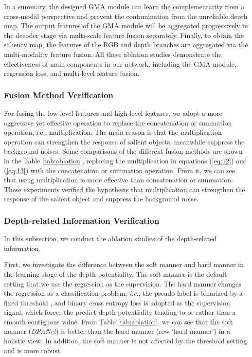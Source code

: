 \documentclass[journal]{IEEEtran}
\def\OURNET{\textit{DPANet}}
\newcommand{\ie}{\textit{i}.\textit{e}.}
\begin{document}
In a summary, the designed GMA module can learn the complementarity from a cross-modal perspective and prevent the contamination from the unreliable depth map. The output features of the GMA module will be aggregated progressively in the decoder stage via multi-scale feature fusion separately. Finally, to obtain the saliency map, the features of the RGB and depth branches are aggregated via the multi-modality feature fusion. All these ablation studies demonstrate the effectiveness of main components in our network, including the GMA module, regression loss, and multi-level feature fusion.

\subsubsection{\textbf{Fusion Method Verification}} For fusing the low-level features and high-level features, we adopt a more aggressive yet effective operation to replace the concatenation or summation operation, i.e., multiplication. The main reason is that the multiplication operation can strengthen the response of salient objects, meanwhile suppress the background noises. Some comparisons of the different fusion methods are shown in the Table \ref{tab:ablation}, replacing the multiplication in equations (\ref{eq:12}) and (\ref{eq:13}) with the concatenation or summation operation. From it, we can see that using multiplication is more effective than concatenation or summation. These experiments verified the hypothesis that multiplication can strengthen the response of the salient object and suppress the background noise.

\subsubsection{\textbf{Depth-related Information Verification}} In this subsection, we conduct the ablation studies of the depth-related information.

First, we investigate the difference between the soft manner and hard manner in the learning stage of the depth potentiality. The soft manner is the default setting that we use the regression as the supervision. The hard manner changes the regression as a classification problem, \ie, the pseudo label  is binarized by a fixed threshold , and binary cross entropy loss is adopted as the supervision signal, which forces the predict depth potentiality  tending to  or  rather than a smooth contiguous value. From Table \ref{tab:ablation}, we can see that the soft manner (\OURNET) is better than the hard manner (row `hard manner') in a holistic view. In addition, the soft manner is not affected by the threshold setting and is more robust.
\end{document}
